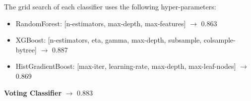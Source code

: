 \documentclass[5 pt]{article}
\begin{document}
The grid search of each classifier uses the following hyper-parameters:

\begin{itemize}
    \item RandomForest: [n-estimators, max-depth, max-features] \(\longrightarrow\) 0.863
    \item XGBoost: [n-estimators, eta, gamma, max-depth, subsample, colsample-bytree]  \(\longrightarrow\) 0.887
    \item HistGradientBoost: [max-iter, learning-rate, max-depth, max-leaf-nodes]  \(\longrightarrow\) 0.869
\end{itemize}

\textbf{Voting Classifier} \(\longrightarrow\) 0.883



 
\end{document}
